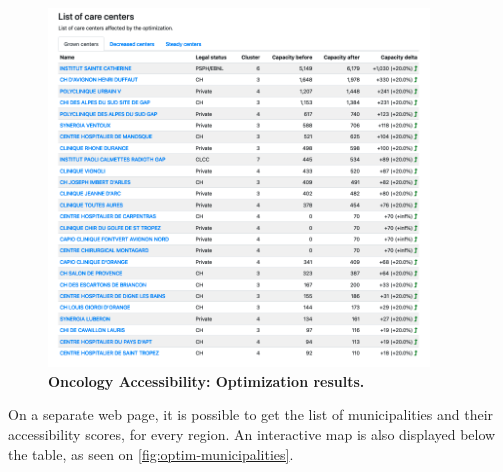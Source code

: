 \begin{figure}[H]
    \includegraphics[width=0.9\textwidth]{images/oncology-accessibility/optim-paca-grown-hospitals.png}
    \centering
    \caption{
        \textbf{Oncology Accessibility: Optimization results.}
    }
    \label{fig:optim-grown-hospitals}
\end{figure}

On a separate web page, it is possible to get the list of municipalities and
their accessibility scores, for every region. An interactive map is also
displayed below the table, as seen on \cref{fig:optim-municipalities}.

